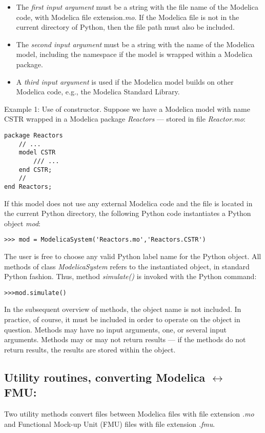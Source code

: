 \begin{itemize}
	\item The \textit{first input argument} must be a string with the file name of the Modelica code, with Modelica file extension\textit{.mo}. If the 	 
	       Modelica file is not in the current directory of Python, then the file path must also be included.
	\item The \textit{second input argument} must be a string with the name of the Modelica model, including the namespace if the model is wrapped 
		  within a Modelica package.
	\item A \textit{third input argument} is used if the Modelica model builds on other Modelica code, e.g., the Modelica Standard Library.
\end{itemize}

Example 1: Use of constructor. Suppose we have a Modelica model with name CSTR wrapped in a Modelica package \textit{Reactors} — stored in file
\textit{Reactor.mo}:

\begin{lstlisting}
package Reactors
	// ...
	model CSTR
		/// ...
	end CSTR;
	//
end Reactors;
\end{lstlisting}

If this model does not use any external Modelica code and the file is located in the current Python directory, the following
Python code instantiates a Python object \textit{mod}:

\begin{lstlisting}
>>> mod = ModelicaSystem('Reactors.mo','Reactors.CSTR')
\end{lstlisting}

The user is free to choose any valid Python label name for the Python object. All methods of class \textit{ModelicaSystem} refers to the instantiated object, in standard Python fashion. Thus, method \textit{simulate()} is invoked with the Python command:

\begin{lstlisting}
>>>mod.simulate()
\end{lstlisting}

In the subsequent overview of methods, the object name is not included. In practice, of course, it must be included in order
to operate on the object in question. Methods may have no input arguments, one, or several input arguments. Methods may or may not return results — if the methods do not return results, the results are stored within the object.

\subsection{Utility routines, converting Modelica $\leftrightarrow$ FMU:}
\label{subsec:pythonmodelicafmu}
Two utility methods convert files between Modelica files with file extension \textit{.mo} and Functional Mock-up Unit (FMU) files with
file extension \textit{.fmu}.

